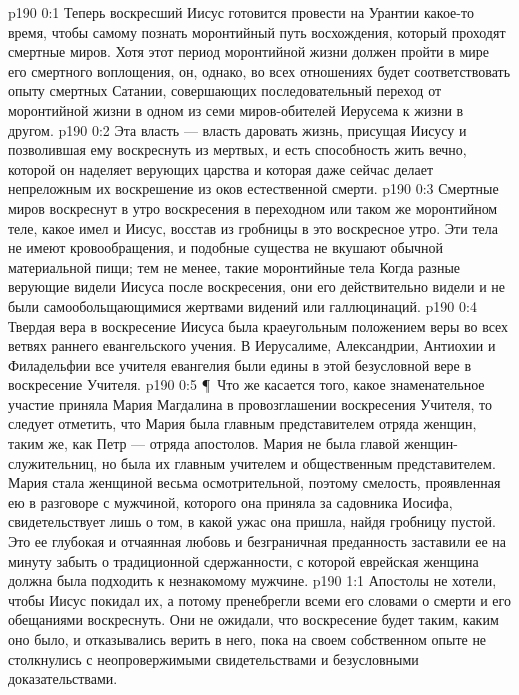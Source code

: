 \vs p190 0:1 Теперь воскресший Иисус готовится провести на Урантии какое\hyp{}то время, чтобы самому познать моронтийный путь восхождения, который проходят смертные миров. Хотя этот период моронтийной жизни должен пройти в мире его смертного воплощения, он, однако, во всех отношениях будет соответствовать опыту смертных Сатании, совершающих последовательный переход от моронтийной жизни в одном из семи миров\hyp{}обителей Иерусема к жизни в другом.
\vs p190 0:2 Эта власть --- власть даровать жизнь, присущая Иисусу и позволившая ему воскреснуть из мертвых, и есть способность жить вечно, которой он наделяет верующих царства и которая даже сейчас делает непреложным их воскрешение из оков естественной смерти.
\vs p190 0:3 Смертные миров воскреснут в утро воскресения в переходном или таком же моронтийном теле, какое имел и Иисус, восстав из гробницы в это воскресное утро. Эти тела не имеют кровообращения, и подобные существа не вкушают обычной материальной пищи; тем не менее, такие моронтийные тела  Когда разные верующие видели Иисуса после воскресения, они его действительно видели и не были самообольщающимися жертвами видений или галлюцинаций.
\vs p190 0:4 Твердая вера в воскресение Иисуса была краеугольным положением веры во всех ветвях раннего евангельского учения. В Иерусалиме, Александрии, Антиохии и Филадельфии все учителя евангелия были едины в этой безусловной вере в воскресение Учителя.
\vs p190 0:5 \P\ Что же касается того, какое знаменательное участие приняла Мария Магдалина в провозглашении воскресения Учителя, то следует отметить, что Мария была главным представителем отряда женщин, таким же, как Петр --- отряда апостолов. Мария не была главой женщин\hyp{}служительниц, но была их главным учителем и общественным представителем. Мария стала женщиной весьма осмотрительной, поэтому смелость, проявленная ею в разговоре с мужчиной, которого она приняла за садовника Иосифа, свидетельствует лишь о том, в какой ужас она пришла, найдя гробницу пустой. Это ее глубокая и отчаянная любовь и безграничная преданность заставили ее на минуту забыть о традиционной сдержанности, с которой еврейская женщина должна была подходить к незнакомому мужчине.
\vs p190 1:1 Апостолы не хотели, чтобы Иисус покидал их, а потому пренебрегли всеми его словами о смерти и его обещаниями воскреснуть. Они не ожидали, что воскресение будет таким, каким оно было, и отказывались верить в него, пока на своем собственном опыте не столкнулись с неопровержимыми свидетельствами и безусловными доказательствами.
